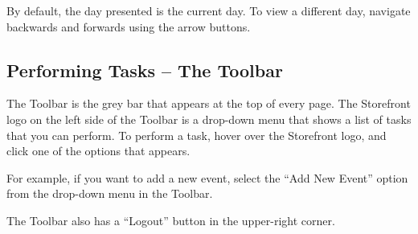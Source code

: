 By default, the day presented is the current day. To view a different day, navigate backwards and forwards using the arrow buttons.


\subsection{Performing Tasks -- The Toolbar}

The Toolbar is the grey bar that appears at the top of every page. The Storefront logo on the left side of the Toolbar is a drop-down menu that shows a list of tasks that you can perform. To perform a task, hover over the Storefront logo, and click one of the options that appears.

For example, if you want to add a new event, select the ``Add New Event'' option from the drop-down menu in the Toolbar.

The Toolbar also has a ``Logout'' button in the upper-right corner.


